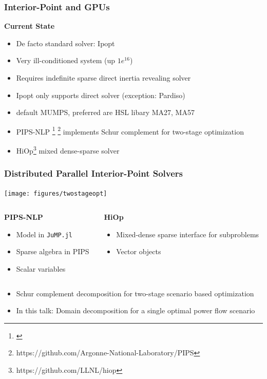 \begin{frame}[fragile]
  \frametitle{Interior-Point and GPUs}
  {\bf Current State}
  \begin{itemize}
    \item De facto standard solver: Ipopt
    \item Very ill-conditioned system (up $1e^{16}$)
    \item Requires indefinite sparse direct inertia revealing solver
    \item Ipopt only supports direct solver (exception: Pardiso)
    \item default MUMPS, preferred are HSL libary MA27, MA57 
    \item PIPS-NLP \footnote{\cite{pips}} \footnote{https://github.com/Argonne-National-Laboratory/PIPS} implements Schur complement for two-stage optimization
    \item HiOp\footnote{https://github.com/LLNL/hiop} mixed dense-sparse solver 
  \end{itemize}
\end{frame}
\begin{frame}
  \frametitle{Distributed Parallel Interior-Point Solvers}
  \begin{center}
    \texttt{[image: figures/twostageopt]}
  \end{center}
  \begin{columns}[T]
    \begin{column}{0.45\textwidth}
      {\bf PIPS-NLP}
      \begin{itemize}
        \item Model in \lstinline{JuMP.jl}
        \item Sparse algebra in PIPS
        \item Scalar variables
      \end{itemize}
    \end{column}
    \begin{column}{0.45\textwidth}
      {\bf HiOp}
      \begin{itemize}
        \item Mixed-dense sparse interface for subproblems
        \item Vector objects
      \end{itemize}
    \end{column}
  \end{columns}
  \begin{itemize}
    \item Schur complement decomposition for two-stage scenario based optimization
    \item In this talk: \alert{Domain decomposition for a single optimal power flow scenario}
  \end{itemize}
\end{frame}

